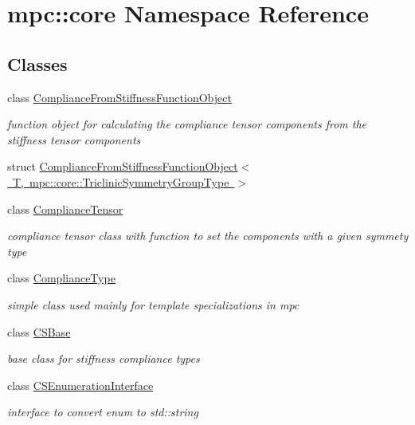 \hypertarget{namespacempc_1_1core}{}\section{mpc\+:\+:core Namespace Reference}
\label{namespacempc_1_1core}
\subsection*{Classes}
\begin{DoxyCompactItemize}
\item 
class \mbox{\hyperlink{structmpc_1_1core_1_1_compliance_from_stiffness_function_object}{Compliance\+From\+Stiffness\+Function\+Object}}
\begin{DoxyCompactList}\small\item\em function object for calculating the compliance tensor components from the stiffness tensor components \end{DoxyCompactList}\item 
struct \mbox{\hyperlink{structmpc_1_1core_1_1_compliance_from_stiffness_function_object_3_01_t_00_01mpc_1_1core_1_1_triclinic_symmetry_group_type_01_4}{Compliance\+From\+Stiffness\+Function\+Object$<$ T, mpc\+::core\+::\+Triclinic\+Symmetry\+Group\+Type $>$}}
\item 
class \mbox{\hyperlink{structmpc_1_1core_1_1_compliance_tensor}{Compliance\+Tensor}}
\begin{DoxyCompactList}\small\item\em compliance tensor class with function to set the components with a given symmety type \end{DoxyCompactList}\item 
class \mbox{\hyperlink{structmpc_1_1core_1_1_compliance_type}{Compliance\+Type}}
\begin{DoxyCompactList}\small\item\em simple class used mainly for template specializations in mpc \end{DoxyCompactList}\item 
class \mbox{\hyperlink{structmpc_1_1core_1_1_c_s_base}{C\+S\+Base}}
\begin{DoxyCompactList}\small\item\em base class for stiffness compliance types \end{DoxyCompactList}\item 
class \mbox{\hyperlink{structmpc_1_1core_1_1_c_s_enumeration_interface}{C\+S\+Enumeration\+Interface}}
\begin{DoxyCompactList}\small\item\em interface to convert enum to std\+::string \end{DoxyCompactList}\item 

\end{DoxyCompactItemize}
